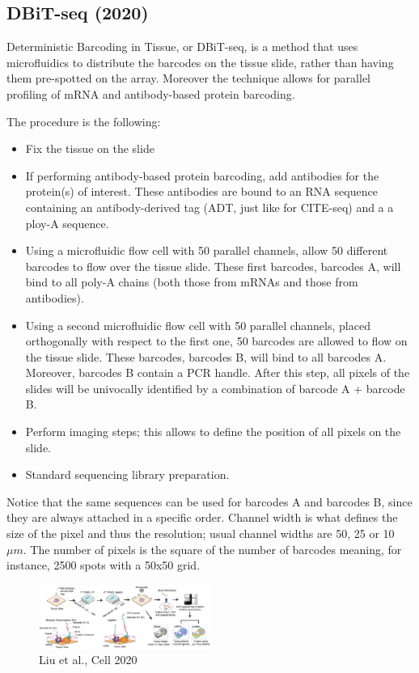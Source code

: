 \hypertarget{dbit-seq-2020}{%
\subsection{DBiT-seq (2020)}\label{dbit-seq-2020}}

Deterministic Barcoding in Tissue, or DBiT-seq, is a method that uses
microfluidics to distribute the barcodes on the tissue slide, rather than
having them pre-spotted on the array. Moreover the technique allows for 
parallel profiling of mRNA and antibody-based protein barcoding.

The procedure is the following:
\begin{itemize}
\tightlist
\item 
  Fix the tissue on the slide
\item
  If performing antibody-based protein barcoding, add antibodies for the
  protein(s) of interest. These antibodies are bound to an RNA sequence
  containing an antibody-derived tag (ADT, just like for CITE-seq) and a
  a ploy-A sequence.
\item 
  Using a microfluidic flow cell with 50 parallel channels, allow 50 
  different barcodes to flow over the tissue slide. These first barcodes, 
  barcodes A, will bind to all poly-A chains (both those from mRNAs and those
  from antibodies). 
\item
  Using a second microfluidic flow cell with 50 parallel channels, placed 
  orthogonally with respect to the first one, 50 barcodes are allowed to
  flow on the tissue slide. These barcodes, barcodes B, will bind to all
  barcodes A. Moreover, barcodes B contain a PCR handle. After this step, 
  all pixels of the slides will be univocally identified by a combination of 
  barcode A + barcode B.
\item 
  Perform imaging steps; this allows to define the position of all pixels 
  on the slide.
\item
  Standard sequencing library preparation.
\end{itemize}

Notice that the same sequences can be used for barcodes A and barcodes B,
since they are always attached in a specific order.
Channel width is what defines the size of the pixel and thus the resolution;
usual channel widths are 50, 25 or 10 $ \mu m$. The number of pixels is the 
square of the number of barcodes meaning, for instance, 2500 spots with a
50x50 grid.

\begin{figure}
\centering
\includegraphics[width=0.5\textwidth]{images/Screenshot_2.png}
\caption{Liu et al., Cell 2020}
\end{figure}

